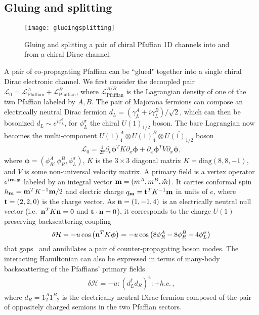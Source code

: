 \subsection{Gluing and splitting}\label{sec:gluing}

\begin{figure}[htbp]
	\centering\texttt{[image: glueingsplitting]}
	\caption{Gluing and splitting a pair of chiral Pfaffian 1D channels into and from a chiral Dirac channel.}\label{fig:glueingsplitting}
\end{figure}

A pair of co-propagating Pfaffian \CFT can be ``glued" together into a single chiral Dirac electronic channel. We first consider the decoupled pair $\mathcal{L}_0=\mathcal{L}_{\mathrm{Pfaffian}}^A+\mathcal{L}_{\mathrm{Pfaffian}}^B$, where $\mathcal{L}_{\mathrm{Pfaffian}}^{A/B}$ is the Lagrangian density of one of the two Pfaffian \CFT labeled by $A,B$. The pair of Majorana fermions can compose an electrically neutral Dirac fermion $d_L=(\gamma^A_L+i\gamma^B_L)/\sqrt{2}$, which can then be bosonized $d_L\sim e^{i\phi^\sigma_L}$, for $\phi^\sigma_L$ the chiral $\overline{U(1)_{1/2}}$ boson. The bare Lagrangian now becomes the multi-component $U(1)_4^A\otimes U(1)_4^B\otimes\overline{U(1)_{1/2}}$ boson \CFT \begin{align}\mathcal{L}_0=\frac{1}{2\pi}\partial_t\boldsymbol{\phi}^TK\partial_x\boldsymbol{\phi}+\partial_x\boldsymbol{\phi}^TV\partial_x\boldsymbol{\phi},\label{881}\end{align} where $\boldsymbol{\phi}=(\phi_R^A,\phi_R^B,\phi^\sigma_L)$, $K$ is the $3\times3$ diagonal matrix $K=\mathrm{diag}(8,8,-1)$, and $V$ is some non-universal velocity matrix. A primary field is a vertex operator $e^{i{\bf m}\cdot\boldsymbol{\phi}}$ labeled by an integral vector ${\bf m}=(m^A,m^B,\tilde{m})$. It carries conformal spin $h_{\bf m}={\bf m}^TK^{-1}{\bf m}/2$ and electric charge $q_{\bf m}={\bf t}^TK^{-1}{\bf m}$ in units of $e$, where ${\bf t}=(2,2,0)$ is the charge vector. As ${\bf n}=(1,-1,4)$ is an electrically neutral null vector (i.e.~${\bf n}^TK{\bf n}=0$ and ${\bf t}\cdot{\bf n}=0$), it corresponds to the charge $U(1)$ preserving backscattering coupling \begin{align}\delta\mathcal{H}=-u\cos\left({\bf n}^TK\boldsymbol{\phi}\right)=-u\cos\left(8\phi^A_R-8\phi^B_R-4\phi^\sigma_L\right)\label{glueingH}\end{align} that gaps~\cite{Haldane95} and annihilates a pair of counter-propagating boson modes. The interacting Hamiltonian can also be expressed in terms of many-body backscattering of the Pfaffians' primary fields \begin{align}\delta\mathcal{H}=-u:\left(d_L^\dagger d_R\right)^4:+h.c. \,,\end{align} where $d_R=1_2^A1_{-2}^B$ is the electrically neutral Dirac fermion composed of the pair of oppositely charged semions in the two Pfaffian sectors.

